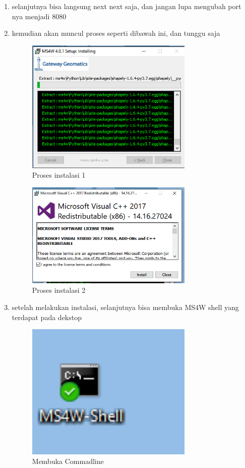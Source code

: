 \begin{enumerate}
	\item selanjutnya bisa langsung next next saja, dan jangan lupa mengubah port nya menjadi 8080

	\item kemudian akan muncul proses seperti dibawah ini, dan tunggu saja
    \hfill\break
	\begin{figure}[H]
		\includegraphics[width=8cm]{figures/1174057/Tugas4tiga.PNG}
		\centering
		\caption{Proses instalasi 1}
	\end{figure}

	\begin{figure}[H]
		\includegraphics[width=8cm]{figures/1174057/Tugas4empat.PNG}
		\centering
		\caption{Proses instalasi 2}
	\end{figure}

	\item setelah melakukan instalasi, selanjutnya bisa membuka MS4W shell yang terdapat pada dekstop
    \hfill\break
	\begin{figure}[H]
		\includegraphics[width=8cm]{figures/1174057/Tugas4lima.PNG}
		\centering
		\caption{Membuka Commadline}
	\end{figure}


\end{enumerate}
